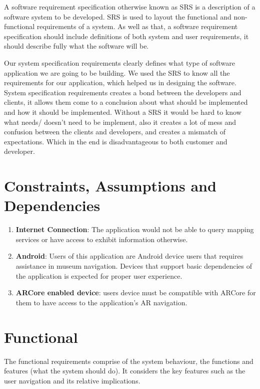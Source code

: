 A software requirement specification otherwise known as SRS is a description of a software system to be developed. SRS is used to layout the functional and non-functional requirements of a system. As well as that, a software requirement specification should include definitions of both system and user requirements, it should describe fully what the software will be.

Our system specification requirements clearly defines what type of software application we are going to be building. We used the SRS to know all the requirements for our application, which helped us in designing the software. System specification requirements creates a bond between the developers and clients, it allows them come to a conclusion about what should be implemented and how it should be implemented. Without a SRS it would be hard to know what needs/ doesn't need to be implement, also it creates a lot of mess and confusion between the clients and developers, and creates a mismatch of expectations. Which in the end is disadvantageous to both customer and developer.

\section*{Constraints, Assumptions and Dependencies}
\begin{enumerate}
    \item \textbf{Internet Connection}: The application would not be able to query mapping services or have access to exhibit information otherwise.
    \item \textbf{Android}: Users of this application are Android device users that requires assistance in museum navigation. Devices that support basic dependencies of the application is expected for proper user experience.
    \item \textbf{ARCore enabled device}: users device must be compatible with ARCore for them to have access to the application's AR navigation.
\end{enumerate}

\section{Functional}
The functional requirements comprise of the system behaviour, the functions and features (what the system should do). It considers the key features such as the user navigation and its relative implications.

